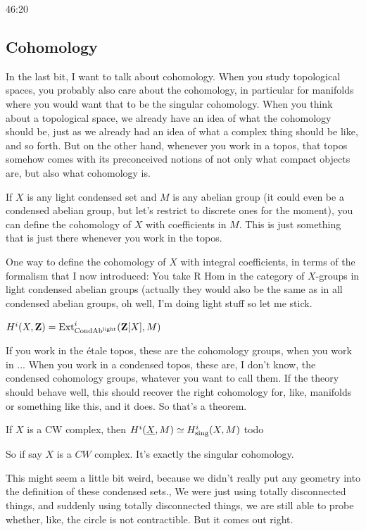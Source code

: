 \begin{unfinished}{46:20}
\subsection{Cohomology}
In the last bit, I want to talk about cohomology. When you study topological spaces, you probably also care about the cohomology, in particular for manifolds where you would want that to be the singular cohomology. When you think about a topological space, we already have an idea of what the cohomology should be, just as we already had an idea of what a complex thing should be like, and so forth. 
But on the other hand, whenever you work in a topos, that topos somehow comes with its preconceived notions of not only what compact objects are, but also what cohomology is.

If $X$ is any light condensed set and $M$ is any abelian group (it could even be a condensed abelian group, but let's restrict to discrete ones for the moment), you can define the cohomology of $X$ with coefficients in $M$. This is just something that is just there whenever you work in the topos.

One way to define the cohomology of $X$ with integral coefficients, in terms of the formalism that I now introduced: You take R Hom in the category of $X$-groups in light condensed abelian groups (actually they would also be the same as in all condensed abelian groups, oh well, I'm doing light stuff so let me stick.

\begin{definition}
$H^i(X, \mathbf Z) = \operatorname{Ext}_{\mathrm{Cond}\mathrm{Ab}^{\mathrm{light}}}^i (\mathbf Z [X], M)$
\end{definition}

If you work in the étale topos, these are the cohomology groups, when you work in ...
When you work in a condensed topos, these are, I don't know, the condensed cohomology groups, whatever you want to call them. 
If the theory should behave well, this should recover the right cohomology for, like, manifolds or something like this, and it does. So that's a theorem.

\begin{theorem}
If $X$ is a CW complex, then
$H^i (\underline{X},M) \simeq H_{\mathrm{sing}}^i (X, M)$ todo
\end{theorem}

So if say $X$ is a $CW$ complex. It's exactly the singular cohomology. 

This might seem a little bit weird, because we didn't really put any geometry into the definition of these condensed sets., We were just using totally disconnected things, and suddenly using totally disconnected things, we are still able to probe whether, like, the circle is not contractible. But it comes out right.


\end{unfinished}

